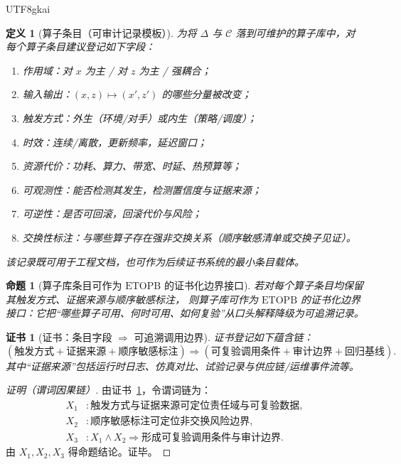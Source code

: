 \documentclass[12pt]{article}
\newtheorem{definition}{定义}[section]
\newtheorem{proposition}{命题}[section]
\newtheorem{Certificate}{证书}[section]
\newcommand{\ETOPB}{\ensuremath{\mathrm{ETOPB}}}
\begin{document}
\begin{CJK*}{UTF8}{gkai}
\begin{definition}[算子条目（可审计记录模板）]
为将 $\Delta$ 与 $\mathcal{C}$ 落到可维护的算子库中，对每个算子条目建议登记如下字段：
\begin{enumerate}
  \item 作用域：对 $x$ 为主 / 对 $z$ 为主 / 强耦合；
  \item 输入输出：$(x,z)\mapsto(x',z')$ 的哪些分量被改变；
  \item 触发方式：外生（环境/对手）或内生（策略/调度）；
  \item 时效：连续/离散，更新频率，延迟窗口；
  \item 资源代价：功耗、算力、带宽、时延、热预算等；
  \item 可观测性：能否检测其发生，检测置信度与证据来源；
  \item 可逆性：是否可回滚，回滚代价与风险；
  \item 交换性标注：与哪些算子存在强非交换关系（顺序敏感清单或交换子见证）。
\end{enumerate}
该记录既可用于工程文档，也可作为后续证书系统的最小条目载体。
\end{definition}

\begin{proposition}[算子库条目可作为 \ETOPB{} 的证书化边界接口]
\label{prop:operator-library-as-certificate-interface}
若对每个算子条目均保留其触发方式、证据来源与顺序敏感标注，
则算子库可作为 \ETOPB{} 的证书化边界接口：它把“哪些算子可用、何时可用、如何复验”从口头解释降级为可追溯记录。
\end{proposition}

\begin{Certificate}[证书：条目字段 $\Rightarrow$ 可追溯调用边界]
\label{cert:operator-library-as-certificate-interface}
证书登记如下蕴含链：
\[
  (\text{触发方式}+\text{证据来源}+\text{顺序敏感标注})
  \Rightarrow
  (\text{可复验调用条件}+\text{审计边界}+\text{回归基线}).
\]
其中“证据来源”包括运行时日志、仿真对比、试验记录与供应链/运维事件流等。
\end{Certificate}

\begin{proof}[证明（谓词因果链）]
由证书~\ref{cert:operator-library-as-certificate-interface}，令谓词链为：
\[
\begin{aligned}
  X_1 &: \text{触发方式与证据来源可定位责任域与可复验数据},\\
  X_2 &: \text{顺序敏感标注可定位非交换风险边界},\\
  X_3 &: X_1\wedge X_2\Rightarrow \text{形成可复验调用条件与审计边界}.
\end{aligned}
\]
由 $X_1,X_2,X_3$ 得命题结论。证毕。
\end{proof}


\end{CJK*}
\end{document}
